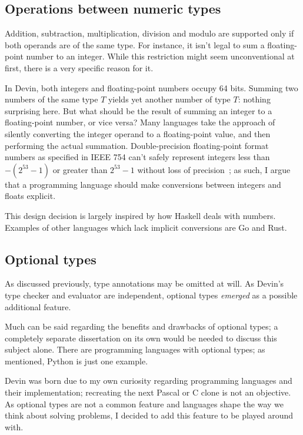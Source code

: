 \documentclass[UdineBachThesis,american,11pt,draft]{PhdThesis}
\begin{document}
  \subsection{Operations between numeric types}

  Addition, subtraction, multiplication, division and modulo are supported only
  if both operands are of the same type. For instance, it isn't legal to sum a
  floating-point number to an integer. While this restriction might seem
  unconventional at first, there is a very specific reason for it.

  In Devin, both integers and floating-point numbers occupy 64 bits. Summing two
  numbers of the same type $T$ yields yet another number of type $T$: nothing
  surprising here. But what should be the result of summing an integer to a
  floating-point number, or vice versa? Many languages take the approach of
  silently converting the integer operand to a floating-point value, and then
  performing the actual summation. Double-precision floating-point format
  numbers as specified in IEEE 754 can't safely represent integers less than
  $-\left(2^{53} - 1\right)$ or greater than $2^{53} - 1$ without loss of
  precision~\cite{mdn}; as such, I argue that a programming language should make
  conversions between integers and floats explicit.

  This design decision is largely inspired by how Haskell deals with numbers.
  Examples of other languages which lack implicit conversions are Go and Rust.

  \subsection{Optional types}

  As discussed previously, type annotations may be omitted at will. As Devin's
  type checker and evaluator are independent, optional types \emph{emerged} as a
  possible additional feature.

  Much can be said regarding the benefits and drawbacks of optional types; a
  completely separate dissertation on its own would be needed to discuss this
  subject alone. There are programming languages with optional types; as
  mentioned, Python is just one example.

  Devin was born due to my own curiosity regarding programming languages and
  their implementation; recreating the next Pascal or C clone is not an
  objective. As optional types are not a common feature and languages shape the
  way we think about solving problems, I decided to add this feature to be
  played around with.
\end{document}

